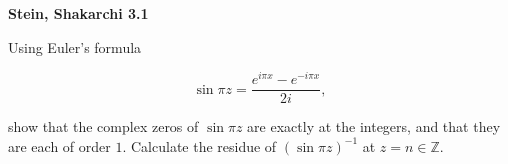 \textbf{Stein, Shakarchi 3.1}

Using Euler's formula

$$
\sin{\pi z} = \frac{e^{i \pi x} - e^{-i \pi x}}{2i},
$$

show that the complex zeros of $\sin{\pi z}$ are exactly at the integers, and that they are each of order $1$. Calculate
the residue of $\left(\sin{\pi z}\right)^{-1}$ at $z = n \in \mathbb{Z}$.

\begin{solution}
  \ \\
\end{solution}